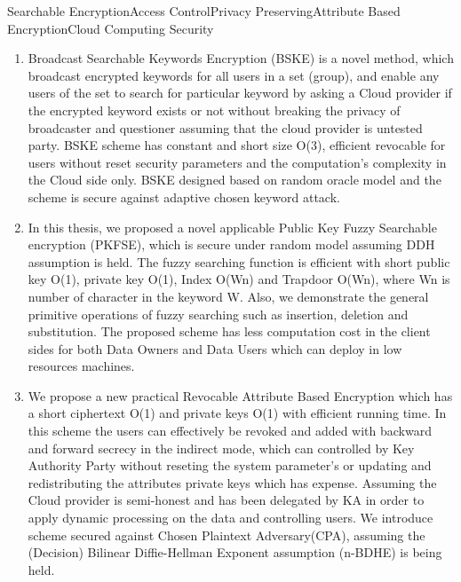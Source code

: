 \begin{Eabstract}{Searchable Encryption}{Access Control}{Privacy Preserving}{Attribute Based Encryption}{Cloud Computing Security}
\begin{enumerate}
	\item Broadcast Searchable Keywords Encryption (BSKE) is a novel method, which broadcast encrypted keywords for all users in a set (group), and enable any users of the set to search for particular keyword by asking a Cloud provider if the encrypted keyword exists or not without breaking the privacy of broadcaster and questioner assuming that the cloud provider is untested party. BSKE scheme has constant and short size O(3), efficient revocable for users without reset security parameters and the computation's complexity in the Cloud side only. BSKE designed based on random oracle model and the scheme is secure against adaptive chosen keyword attack.
	\item In this thesis, we proposed a novel applicable Public Key Fuzzy Searchable encryption (PKFSE), which is secure under random model assuming DDH assumption is held. The fuzzy searching function is efficient with short public key O(1), private key O(1), Index O(Wn) and Trapdoor O(Wn), where Wn is number of character in the keyword W. Also, we demonstrate the general primitive operations of fuzzy searching such as insertion, deletion and substitution. The proposed scheme has less computation cost in the client sides for both Data Owners and Data Users which can deploy in low resources machines.
	\item We propose a new practical Revocable Attribute Based Encryption which has a short ciphertext O(1) and private keys O(1) with efficient running time. In this scheme the users can effectively be revoked and added with backward and forward secrecy in the indirect mode, which can controlled by Key Authority Party without reseting the system parameter's or updating and redistributing the attributes private keys which has expense. Assuming the Cloud provider is semi-honest and has been delegated by KA in order to apply dynamic processing on the data and controlling users. We introduce scheme secured against Chosen Plaintext Adversary(CPA), assuming the (Decision) Bilinear Diffie-Hellman Exponent assumption (n-BDHE) is being held.
\end{enumerate}
\end{Eabstract}
